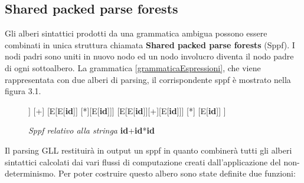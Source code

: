 \subsection{Shared packed parse forests}
Gli alberi sintattici prodotti da una grammatica ambigua \cite{tesi: lr} possono essere combinati in unica struttura chiamata \textbf{Shared packed parse forests} (Sppf). I nodi padri sono uniti in nuovo nodo ed un nodo involucro diventa il nodo padre di ogni sottoalbero. La grammatica \ref{grammaticaEspressioni}, che viene rappresentata con due alberi di parsing, il corrispondente sppf è mostrato nella figura 3.1. 
\begin{figure}[hbpb]
	\centering
	\begin{forest}
	[E
	[E[\textbf{id}]] [+] [E[E[\textbf{id}]] [*][E[\textbf{id}]]]
	[E[E[\textbf{id}]][+][E[\textbf{id}]]] [*] [E[\textbf{id}]]
	]
	\end{forest}
	\caption{\textit{Sppf relativo alla stringa} \textbf{id}+\textbf{id}*\textbf{id} }\label{sppf}
\end{figure}
Il parsing GLL restituirà in output un sppf in quanto combinerà tutti gli alberi sintattici calcolati dai vari flussi di computazione creati dall'applicazione del non-determinismo. Per poter costruire questo albero sono state definite due funzioni:

